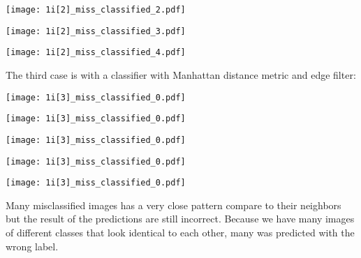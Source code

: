 \documentclass[11pt]{article}
\begin{document}
\texttt{[image: 1i[2]\_miss\_classified\_2.pdf]}

\texttt{[image: 1i[2]\_miss\_classified\_3.pdf]}

\texttt{[image: 1i[2]\_miss\_classified\_4.pdf]}

The third case is with a classifier with Manhattan distance metric and edge filter:

\texttt{[image: 1i[3]\_miss\_classified\_0.pdf]}

\texttt{[image: 1i[3]\_miss\_classified\_0.pdf]}

\texttt{[image: 1i[3]\_miss\_classified\_0.pdf]}

\texttt{[image: 1i[3]\_miss\_classified\_0.pdf]}

\texttt{[image: 1i[3]\_miss\_classified\_0.pdf]}

Many misclassified images has a very close pattern compare to their neighbors but the result of the predictions are still incorrect. Because we have many images of different classes that look identical to each other, many was predicted with the wrong label.

\end{document}
